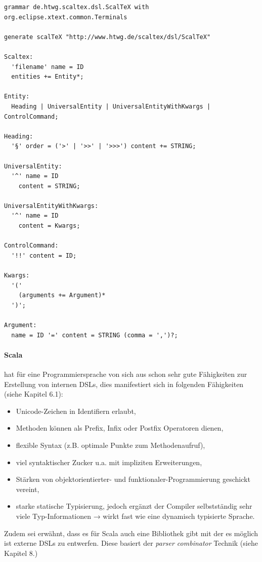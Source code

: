 \begin{lstlisting}[label=xtext-gramm,caption=An Scala-DSL angelente Xtext-Grammatik.]
grammar de.htwg.scaltex.dsl.ScalTeX with org.eclipse.xtext.common.Terminals

generate scalTeX "http://www.htwg.de/scaltex/dsl/ScalTeX"

Scaltex:
  'filename' name = ID
  entities += Entity*;

Entity:
  Heading | UniversalEntity | UniversalEntityWithKwargs | ControlCommand;

Heading:
  '§' order = ('>' | '>>' | '>>>') content += STRING;

UniversalEntity:
  '^' name = ID
    content = STRING;

UniversalEntityWithKwargs:
  '^' name = ID
    content = Kwargs;

ControlCommand:
  '!!' content = ID;

Kwargs:
  '('
    (arguments += Argument)*
  ')';

Argument:
  name = ID '=' content = STRING (comma = ',')?;
\end{lstlisting}

\paragraph{Scala} hat für eine Programmiersprache von sich aus schon
sehr gute Fähigkeiten zur Erstellung von internen DSLs, dies
manifestiert sich in folgenden Fähigkeiten (siehe \cite{dsls} Kapitel 6.1):

\begin{itemize}
  \item Unicode-Zeichen in Identifiern erlaubt,
  \item Methoden können als Prefix, Infix oder Postfix Operatoren dienen,
  \item flexible Syntax (z.B. optimale Punkte zum Methodenaufruf),
  \item viel syntaktischer Zucker u.a. mit impliziten Erweiterungen,
  \item Stärken von objektorientierter- und funktionaler-Programmierung
        geschickt vereint,
  \item starke statische Typisierung, jedoch ergänzt der Compiler selbstständig
        sehr viele Typ-Informationen → wirkt fast wie eine dynamisch
        typisierte Sprache.
\end{itemize}

Zudem sei erwähnt, dass es für Scala auch eine Bibliothek gibt mit
der es möglich ist externe DSLs zu entwerfen. Diese basiert der
\emph{parser combinator} Technik (siehe \cite{dsls} Kapitel 8.)

